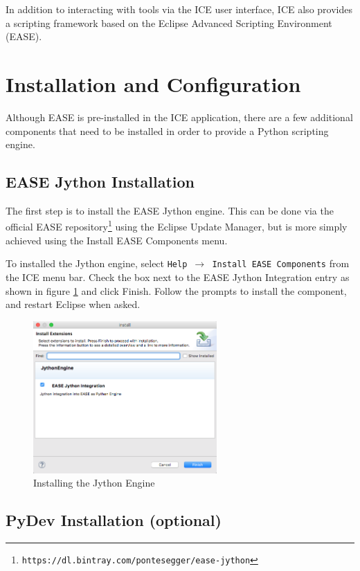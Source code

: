 
In addition to interacting with tools via the ICE user interface, ICE also
provides a scripting framework based on the Eclipse Advanced Scripting
Environment (EASE). 

\section{Installation and Configuration}

Although EASE is pre-installed in the ICE application, there are a few
additional components that need to be installed in order to provide a Python
scripting engine.

\subsection{EASE Jython Installation} 

The first step is to install the EASE Jython engine. This can be done via the
official EASE
repository\footnote{\texttt{https://dl.bintray.com/pontesegger/ease-jython}}
using the Eclipse Update Manager, but is more simply achieved using the Install EASE Components menu.

To installed the Jython engine, select \texttt{Help $\rightarrow$ Install
EASE Components} from the ICE menu bar. Check the box next to the EASE Jython
Integration entry as shown in figure \ref{fig:jython} and click Finish. Follow
the prompts to install the component, and restart Eclipse when asked.

\begin{figure}[!hb]
\centering
\includegraphics[width=7cm]{images/ease-marketplace}
\caption{Installing the Jython Engine}
\label{fig:jython}
\end{figure}

\subsection{PyDev Installation (optional)} 

